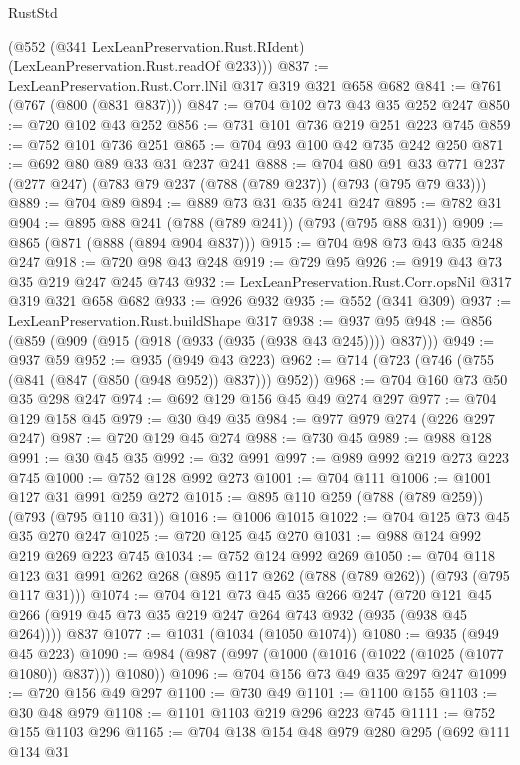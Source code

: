 \begin{lexlean}{RustStd}
\begin{coremodule}
{\begin{coremodule}
{{{{{      (@552 (@341 LexLeanPreservation.Rust.RIdent) (LexLeanPreservation.Rust.readOf @233)))
@837 := LexLeanPreservation.Rust.Corr.lNil @317 @319 @321 @658 @682
@841 := @761 (@767 (@800 (@831 @837)))
@847 := @704 @102 @73 @43 @35 @252 @247
@850 := @720 @102 @43 @252
@856 := @731 @101 @736 @219 @251 @223 @745
@859 := @752 @101 @736 @251
@865 := @704 @93 @100 @42 @735 @242 @250
@871 := @692 @80 @89 @33 @31 @237 @241
@888 := @704
    @80
    @91
    @33
    @771
    @237
    (@277 @247)
    (@783 @79 @237 (@788 (@789 @237)) (@793 (@795 @79 @33)))
@889 := @704 @89
@894 := @889 @73 @31 @35 @241 @247
@895 := @782 @31
@904 := @895 @88 @241 (@788 (@789 @241)) (@793 (@795 @88 @31))
@909 := @865 (@871 (@888 (@894 @904 @837)))
@915 := @704 @98 @73 @43 @35 @248 @247
@918 := @720 @98 @43 @248
@919 := @729 @95
@926 := @919 @43 @73 @35 @219 @247 @245 @743
@932 := LexLeanPreservation.Rust.Corr.opsNil @317 @319 @321 @658 @682
@933 := @926 @932
@935 := @552 (@341 @309)
@937 := LexLeanPreservation.Rust.buildShape @317
@938 := @937 @95
@948 := @856 (@859 (@909 (@915 (@918 (@933 (@935 (@938 @43 @245)))) @837)))
@949 := @937 @59
@952 := @935 (@949 @43 @223)
@962 := @714 (@723 (@746 (@755 (@841 (@847 (@850 (@948 @952)) @837))) @952))
@968 := @704 @160 @73 @50 @35 @298 @247
@974 := @692 @129 @156 @45 @49 @274 @297
@977 := @704 @129 @158 @45
@979 := @30 @49 @35
@984 := @977 @979 @274 (@226 @297 @247)
@987 := @720 @129 @45 @274
@988 := @730 @45
@989 := @988 @128
@991 := @30 @45 @35
@992 := @32 @991
@997 := @989 @992 @219 @273 @223 @745
@1000 := @752 @128 @992 @273
@1001 := @704 @111
@1006 := @1001 @127 @31 @991 @259 @272
@1015 := @895 @110 @259 (@788 (@789 @259)) (@793 (@795 @110 @31))
@1016 := @1006 @1015
@1022 := @704 @125 @73 @45 @35 @270 @247
@1025 := @720 @125 @45 @270
@1031 := @988 @124 @992 @219 @269 @223 @745
@1034 := @752 @124 @992 @269
@1050 := @704
    @118
    @123
    @31
    @991
    @262
    @268
    (@895 @117 @262 (@788 (@789 @262)) (@793 (@795 @117 @31)))
@1074 := @704
    @121
    @73
    @45
    @35
    @266
    @247
    (@720 @121 @45 @266 (@919 @45 @73 @35 @219 @247 @264 @743 @932 (@935 (@938 @45 @264))))
    @837
@1077 := @1031 (@1034 (@1050 @1074))
@1080 := @935 (@949 @45 @223)
@1090 := @984 (@987 (@997 (@1000 (@1016 (@1022 (@1025 (@1077 @1080)) @837))) @1080))
@1096 := @704 @156 @73 @49 @35 @297 @247
@1099 := @720 @156 @49 @297
@1100 := @730 @49
@1101 := @1100 @155
@1103 := @30 @48 @979
@1108 := @1101 @1103 @219 @296 @223 @745
@1111 := @752 @155 @1103 @296
@1165 := @704
    @138
    @154
    @48
    @979
    @280
    @295
    (@692
      @111
      @134
      @31
}}}}}
\end{coremodule}}
\end{coremodule}
\end{lexlean}
